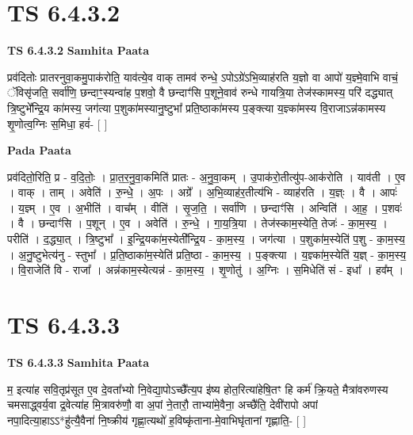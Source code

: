\documentclass[17pt]{extarticle}
\begin{document}
\section*{ TS 6.4.3.2 }

\textbf{TS 6.4.3.2 } \newline
\textbf{Samhita Paata} \newline

प्रव॑दितोः प्रातरनुवा॒कमु॒पाक॑रोति॒ याव॑त्ये॒व वाक् तामव॑ रुन्धे॒ ऽपोऽग्रे॑ऽभि॒व्याह॑रति य॒ज्ञो वा आपो॑ य॒ज्ञ्मे॒वाभि वाचं॒ ॅविसृ॑जति॒ सर्वा॑णि॒ छन्दाꣳ॒॒स्यन्वा॑ह प॒शवो॒ वै छन्दाꣳ॑सि प॒शूने॒वाव॑ रुन्धे गायत्रि॒या तेज॑स्कामस्य॒ परि॑ दद्ध्यात् त्रि॒ष्टुभे᳚न्द्रि॒य का॑मस्य॒ जग॑त्या प॒शुका॑मस्यानु॒ष्टुभा᳚ प्रति॒ष्ठाका॑मस्य प॒ङ्क्त्या य॒ज्ञ्का॑मस्य वि॒राजाऽन्न॑कामस्य शृ॒णोत्व॒ग्निः स॒मिधा॒ हवं॑- [  ] \newline

\textbf{Pada Paata} \newline

प्रव॑दितो॒रिति॒ प्र - व॒दि॒तोः॒ । प्रा॒त॒र॒नु॒वा॒कमिति॑ प्रातः - अ॒नु॒वा॒कम् । उ॒पाक॑रो॒तीत्यु॑प-आक॑रोति । याव॑ती । ए॒व । वाक् । ताम् । अवेति॑ । रु॒न्धे॒ । अ॒पः । अग्रे᳚ । अ॒भि॒व्याह॑र॒तीत्य॑भि - व्याह॑रति । य॒ज्ञ्ः । वै । आपः॑ । य॒ज्ञ्म् । ए॒व । अ॒भीति॑ । वाच᳚म् । वीति॑ । सृ॒ज॒ति॒ । सर्वा॑णि । छन्दाꣳ॑सि । अन्विति॑ । आ॒ह॒ । प॒शवः॑ । वै । छन्दाꣳ॑सि । प॒शून् । ए॒व । अवेति॑ । रु॒न्धे॒ । गा॒य॒त्रि॒या । तेज॑स्काम॒स्येति॒ तेजः॑ - का॒म॒स्य॒ । परीति॑ । द॒द्ध्या॒त् । त्रि॒ष्टुभा᳚ । इ॒न्द्रि॒यका॑म॒स्येती᳚न्द्रि॒य - का॒म॒स्य॒ । जग॑त्या । प॒शुका॑म॒स्येति॑ प॒शु - का॒म॒स्य॒ । अ॒नु॒ष्टुभेत्य॑नु - स्तुभा᳚ । प्र॒ति॒ष्ठाका॑म॒स्येति॑ प्रति॒ष्ठा - का॒म॒स्य॒ । प॒ङ्क्त्या । य॒ज्ञ्का॑म॒स्येति॑ य॒ज्ञ् - का॒म॒स्य॒ । वि॒राजेति॑ वि - राजा᳚ । अन्न॑काम॒स्येत्यन्न॑ - का॒म॒स्य॒ । शृ॒णोतु॑ । अ॒ग्निः । स॒मिधेति॑ सं - इधा᳚ । हव᳚म् ।  \newline




\section*{ TS 6.4.3.3 }

\textbf{TS 6.4.3.3 } \newline
\textbf{Samhita Paata} \newline

म॒ इत्या॑ह सवि॒तृप्र॑सूत ए॒व दे॒वता᳚भ्यो नि॒वेद्या॒पोऽच्छै᳚त्य॒प इ॑ष्य होत॒रित्या॑हेषि॒तꣳ हि कर्म॑ क्रि॒यते॒ मैत्रा॑वरुणस्य चमसाद्ध्वर्य॒वा द्र॒वेत्या॑ह मि॒त्रावरु॑णौ॒ वा अ॒पां ने॒तारौ॒ ताभ्या॑मे॒वैना॒ अच्छै॑ति॒ देवी॑रापो अपां नपा॒दित्या॒हाऽऽ*हु॑त्यै॒वैना॑ नि॒ष्क्रीय॑ गृह्णा॒त्यथो॑ ह॒विष्कृ॑ताना-मे॒वाभिघृ॑तानां गृह्णाति॒- [  ] \newline
\end{document}
